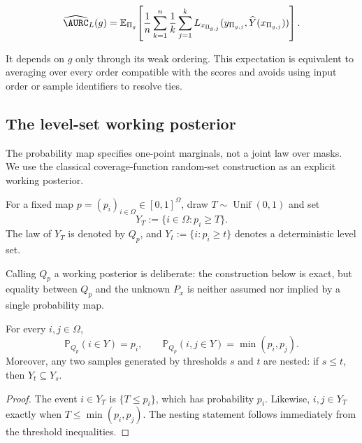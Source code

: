 \begin{equation}
  \widehat{\AURC}_L(g)
  =\mathbb{E}_{\Pi_g}\!\left[
    \frac1n\sum_{k=1}^n
      \frac1k\sum_{j=1}^k
      L_{x_{\Pi_{g,j}}}(y_{\Pi_{g,j}},
                        \widehat Y(x_{\Pi_{g,j}}))
    \right].
  \label{app:eq:empirical-aurc}
\end{equation}

It depends on $g$ only through its weak ordering. This expectation is
equivalent to averaging over every order compatible with the scores and avoids
using input order or sample identifiers to resolve ties.

\subsection{The level-set working posterior}

The probability map specifies one-point marginals, not a joint law over
masks.  We use the classical coverage-function random-set construction
\cite{goodman,molchanov} as an explicit working posterior.

\begin{definition}
\label{app:def:levelset-posterior}
For a fixed map $p=(p_i)_{i\in\Omega}\in[0,1]^\Omega$, draw
$T\sim\operatorname{Unif}(0,1)$ and set
\begin{equation}
  Y_T:=\{i\in\Omega:p_i\geq T\}.
\end{equation}
The law of $Y_T$ is denoted by $Q_p$, and
$Y_t:=\{i:p_i\geq t\}$ denotes a deterministic level set.
\end{definition}

Calling $Q_p$ a working posterior is deliberate: the construction below
is exact, but equality between $Q_p$ and the unknown $P_x$ is neither
assumed nor implied by a single probability map.

\begin{proposition}
\label{app:prop:levelset-properties}
For every $i,j\in\Omega$,
\begin{equation}
  \mathbb{P}_{Q_p}(i\in Y)=p_i,
  \qquad
  \mathbb{P}_{Q_p}(i,j\in Y)=\min(p_i,p_j).
  \label{app:eq:levelset-marginals}
\end{equation}
Moreover, any two samples generated by thresholds $s$ and $t$ are
nested: if $s\leq t$, then $Y_t\subseteq Y_s$.
\end{proposition}

\begin{proof}
The event $i\in Y_T$ is $\{T\leq p_i\}$, which has probability $p_i$.
Likewise, $i,j\in Y_T$ exactly when
$T\leq\min(p_i,p_j)$.  The nesting statement follows immediately from
the threshold inequalities.
\end{proof}

